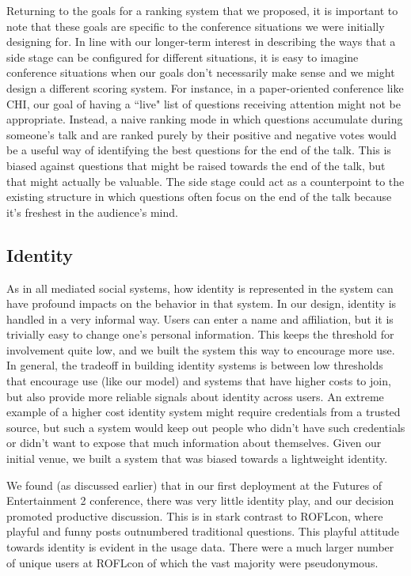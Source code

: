 Returning to the goals for a ranking system that we proposed, it is important to note that these goals are specific to the conference situations we were initially designing for. In line with our longer-term interest in describing the ways that a side stage can be configured for different situations, it is easy to imagine conference situations when our goals don't necessarily make sense and we might design a different scoring system. For instance, in a paper-oriented conference like CHI, our goal of having a ``live" list of questions receiving attention might not be appropriate. Instead, a naive ranking mode in which questions accumulate during someone's talk and are ranked purely by their positive and negative votes would be a useful way of identifying the best questions for the end of the talk. This is biased against questions that might be raised towards the end of the talk, but that might actually be valuable. The side stage could act as a counterpoint to the existing structure in which questions often focus on the end of the talk because it's freshest in the audience's mind.


\subsection{Identity}
As in all mediated social systems, how identity is represented in the system can have profound impacts on the behavior in that system. In our design, identity is handled in a very informal way. Users can enter a name and affiliation, but it is trivially easy to change one's personal information. This keeps the threshold for involvement quite low, and we built the system this way to encourage more use. In general, the tradeoff in building identity systems is between low thresholds that encourage use (like our model) and systems that have higher costs to join, but also provide more reliable signals about identity across users. An extreme example of a higher cost identity system might require credentials from a trusted source, but such a system would keep out people who didn't have such credentials or didn't want to expose that much information about themselves. Given our initial venue, we built a system that was biased towards a lightweight identity.

We found (as discussed earlier) that in our first deployment at the Futures of Entertainment 2 conference, there was very little identity play, and our decision promoted productive discussion. This is in stark contrast to ROFLcon, where playful and funny posts outnumbered traditional questions. This playful attitude towards identity is evident in the usage data. There were a much larger number of unique users at ROFLcon of which the vast majority were pseudonymous.

